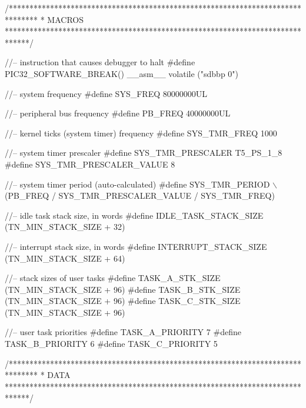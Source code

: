 \begin{DoxyCodeInclude}
\textcolor{comment}{/*******************************************************************************}
\textcolor{comment}{ *    MACROS}
\textcolor{comment}{ ******************************************************************************/}

\textcolor{comment}{//-- instruction that causes debugger to halt}
\textcolor{preprocessor}{#define PIC32\_SOFTWARE\_BREAK()  \_\_asm\_\_ volatile ("sdbbp 0")}

\textcolor{comment}{//-- system frequency}
\textcolor{preprocessor}{#define SYS\_FREQ           80000000UL}

\textcolor{comment}{//-- peripheral bus frequency}
\textcolor{preprocessor}{#define PB\_FREQ            40000000UL}

\textcolor{comment}{//-- kernel ticks (system timer) frequency}
\textcolor{preprocessor}{#define SYS\_TMR\_FREQ       1000}

\textcolor{comment}{//-- system timer prescaler}
\textcolor{preprocessor}{#define SYS\_TMR\_PRESCALER           T5\_PS\_1\_8}
\textcolor{preprocessor}{#define SYS\_TMR\_PRESCALER\_VALUE     8}

\textcolor{comment}{//-- system timer period (auto-calculated)}
\textcolor{preprocessor}{#define SYS\_TMR\_PERIOD              \(\backslash\)}
\textcolor{preprocessor}{   (PB\_FREQ / SYS\_TMR\_PRESCALER\_VALUE / SYS\_TMR\_FREQ)}




\textcolor{comment}{//-- idle task stack size, in words}
\textcolor{preprocessor}{#define IDLE\_TASK\_STACK\_SIZE          (TN\_MIN\_STACK\_SIZE + 32)}

\textcolor{comment}{//-- interrupt stack size, in words}
\textcolor{preprocessor}{#define INTERRUPT\_STACK\_SIZE          (TN\_MIN\_STACK\_SIZE + 64)}

\textcolor{comment}{//-- stack sizes of user tasks}
\textcolor{preprocessor}{#define TASK\_A\_STK\_SIZE    (TN\_MIN\_STACK\_SIZE + 96)}
\textcolor{preprocessor}{#define TASK\_B\_STK\_SIZE    (TN\_MIN\_STACK\_SIZE + 96)}
\textcolor{preprocessor}{#define TASK\_C\_STK\_SIZE    (TN\_MIN\_STACK\_SIZE + 96)}

\textcolor{comment}{//-- user task priorities}
\textcolor{preprocessor}{#define TASK\_A\_PRIORITY    7}
\textcolor{preprocessor}{#define TASK\_B\_PRIORITY    6}
\textcolor{preprocessor}{#define TASK\_C\_PRIORITY    5}



\textcolor{comment}{/*******************************************************************************}
\textcolor{comment}{ *    DATA}
\textcolor{comment}{ ******************************************************************************/}


\end{DoxyCodeInclude}
